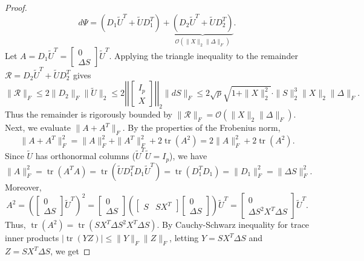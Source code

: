 \documentclass[11pt]{article}
\begin{document}
\begin{proof}
$$ d\Psi = (D_1 \tilde{U}^T + \tilde{U} D_1^T) + \underbrace{(D_2 \tilde{U}^T + \tilde{U} D_2^T)}_{\mathcal{O}(\|X\|_2\|\Delta\|_F)}. $$
Let $A = D_1 \tilde{U}^T = \begin{bmatrix} 0 \\ \Delta S \end{bmatrix} \tilde{U}^T$. Applying the triangle inequality to the remainder $\mathcal{R} = D_2 \tilde{U}^T + \tilde{U} D_2^T$ gives 
$$ \|\mathcal{R}\|_F \le 2 \|D_2\|_F \|\tilde{U}\|_2 \le 2 \left|\left| \begin{bmatrix} I_p \\ X \end{bmatrix} \right|\right|_2 \|dS\|_F \le 2\sqrt{p} \sqrt{1 + \|X\|_2^2} \cdot \|S\|_2^3 \|X\|_2 \|\Delta\|_F. $$
Thus the remainder is rigorously bounded by $\|\mathcal{R}\|_F = \mathcal{O}(\|X\|_2\|\Delta\|_F)$.  Next, we evaluate $\|A + A^T\|_F$. By the properties of the Frobenius norm,
\begin{equation}\label{eq:a_plus_at_norm}
\|A + A^T\|_F^2 = \|A\|_F^2 + \|A^T\|_F^2 + 2\operatorname{tr}(A^2) = 2\|A\|_F^2 + 2\operatorname{tr}(A^2).
\end{equation}
Since $\widetilde U$ has orthonormal columns ($\widetilde U^T \widetilde U = I_p$), we have $$\|A\|_F^2 = \operatorname{tr}(A^T A) = \operatorname{tr}(\widetilde U D_1^T D_1 \widetilde U^T) = \operatorname{tr}(D_1^T D_1) = \|D_1\|_F^2 = \|\Delta S\|_F^2.$$
Moreover, 
 $$
A^2 = \left( \begin{bmatrix} 0 \\ \Delta S \end{bmatrix} \widetilde U^T \right)^2 = \begin{bmatrix} 0 \\ \Delta S \end{bmatrix} \left( \begin{bmatrix} S & S X^T \end{bmatrix} \begin{bmatrix} 0 \\ \Delta S \end{bmatrix} \right) \widetilde U^T = \begin{bmatrix} 0 \\ \Delta S^2 X^T \Delta S \end{bmatrix} \widetilde U^T.
 $$
Thus, $\operatorname{tr}(A^2) = \operatorname{tr}(S X^T \Delta S^2 X^T \Delta S)$. By Cauchy-Schwarz inequality for trace inner products $|\operatorname{tr}(Y Z)| \leq \|Y\|_F \|Z\|_F$, letting $Y = S X^T \Delta S$ and $Z = S X^T \Delta S$, we get

\end{proof}
\end{document}
